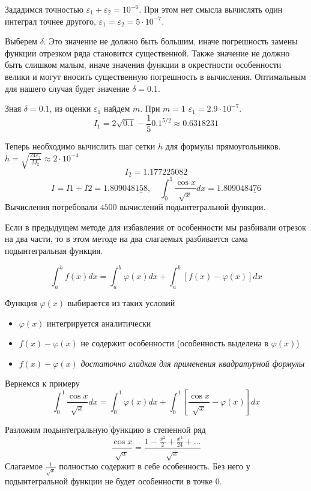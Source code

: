 \documentclass[professionalfonts,compress,unicode]{beamer}
\begin{document}
{
	Зададимся точностью $\varepsilon_1 + \varepsilon_2 = 10^{-6}$. При этом нет смысла 
	вычислять один интеграл точнее другого, $\varepsilon_1 = \varepsilon_2 = 5\cdot10^{-7}$.
	
	Выберем $\delta$. Это значение не должно быть большим, иначе погрешность замены 
	функции отрезком ряда становится существенной. Также значение не должно быть слишком малым,
	иначе значения функции в окрестности особенности велики и могут вносить существенную погрешность в вычисления.
	Оптимальным для нашего случая будет значение $\delta = 0.1$.
}

{	
	Зная $\delta = 0.1$, из оценки $\varepsilon_1$ найдем $m$. При $m = 1$ $\varepsilon_1 = 2.9\cdot 10^{-7}$.
	$$
	I_1 = 2\sqrt{0.1} - \frac{1}{5}0.1^{5/2} \approx 0.6318231
	$$

	Теперь необходимо вычислить шаг сетки $h$ для формулы прямоугольников. $h = \sqrt{\frac{24\varepsilon_2}{M_2}} \approx 2\cdot 10^{-4}$
	$$
	I_2 = 1.177225082
	$$
	$$
	I = I1 + I2 = 1.809048\underline{158}, \quad \int_0^1 \frac{\cos x}{\sqrt{x}} dx = 1.809048\underline{476}
	$$
	Вычисления потребовали $4500$ вычислений подынтегральной функции.
}

{
	Если в предыдущем методе для избавления от особенности мы разбивали отрезок на два части, то 
	в этом методе на два слагаемых разбивается сама подынтегральная функция.
	\pause
	
	$$
	\int_a^b f(x) dx = \int_a^b \varphi(x) dx + \int_a^b [f(x) - \varphi(x)] dx
	$$
	\pause
	
	Функция $\varphi(x)$ выбирается из таких условий
	\begin{itemize}
		\item $\varphi(x)$ интегрируется аналитически
		\item $f(x)-\varphi(x)$ не содержит особенности (особенность выделена в $\varphi(x)$)
		\item $f(x)-\varphi(x)$ \emph{достаточно гладкая для применения квадратурной формулы}
	\end{itemize}
}

{
	Вернемся к примеру
	$$
	\int_0^1 \frac{\cos x}{\sqrt{x}} dx = 
	\int_0^1 \varphi(x) dx + 
	\int_0^1 \left[\frac{\cos x}{\sqrt{x}}-\varphi(x)\right] dx
	$$
	\pause
	
	Разложим подынтегральную функцию в степенной ряд
	$$
	\frac{\cos x}{\sqrt{x}} = \frac{1-\frac{x^2}{2} + \frac{x^4}{24} + \dots}{\sqrt{x}}
	$$
	\pause
	Слагаемое $\frac{1}{\sqrt{x}}$ полностью содержит в себе особенность. Без него 
	у подынтегральной функции не будет особенности в точке $0$.
}
\end{document}
